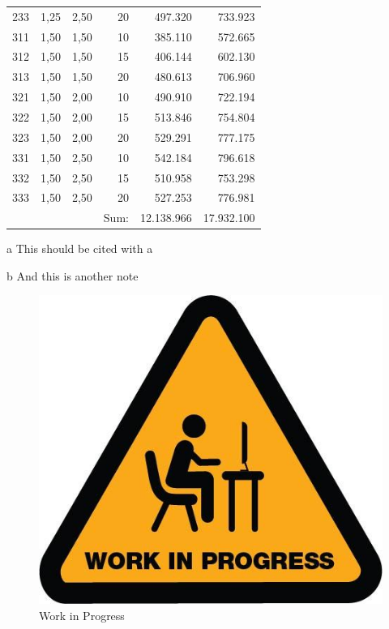 \documentclass[10pt,a4paper,twoside]{article}
\begin{document}
\begin{table}[ht!]
\begin{threeparttable}
\begin{tabular}{rrrrrr}
    233   & 1,25  & 2,50  & 20  & 497.320 & 733.923 \\
    311   & 1,50  & 1,50  & 10   & 385.110 & 572.665 \\
    312   & 1,50  & 1,50  & 15   & 406.144 & 602.130 \\
    313   & 1,50  & 1,50  & 20   & 480.613 & 706.960 \\
    321   & 1,50  & 2,00  & 10   & 490.910 & 722.194 \\
    322   & 1,50  & 2,00  & 15   & 513.846 & 754.804 \\
    323   & 1,50  & 2,00  & 20   & 529.291 & 777.175 \\
    331   & 1,50  & 2,50  & 10   & 542.184 & 796.618 \\
    332   & 1,50  & 2,50  & 15   & 510.958 & 753.298 \\
    333   & 1,50  & 2,50  & 20   & 527.253 & 776.981 \\
         \midrule
          &       &       & Sum: & 12.138.966 & 17.932.100 \\
    \bottomrule
    \end{tabular}%
    \begin{tablenotes}
    	\item[a] This should be cited with a 
    	\item[b] And this is another note
    \end{tablenotes}
  \label{tab:addlabel}%
\end{threeparttable} 
\end{table}

\begin{figure}[ht!]
  \begin{center}
	\includegraphics[width=0.3 \textwidth]{./images/wip}
	\caption{Work in Progress}
	\label{Fig:Boxplot}
  \end{center}
\end{figure}
\end{document}
